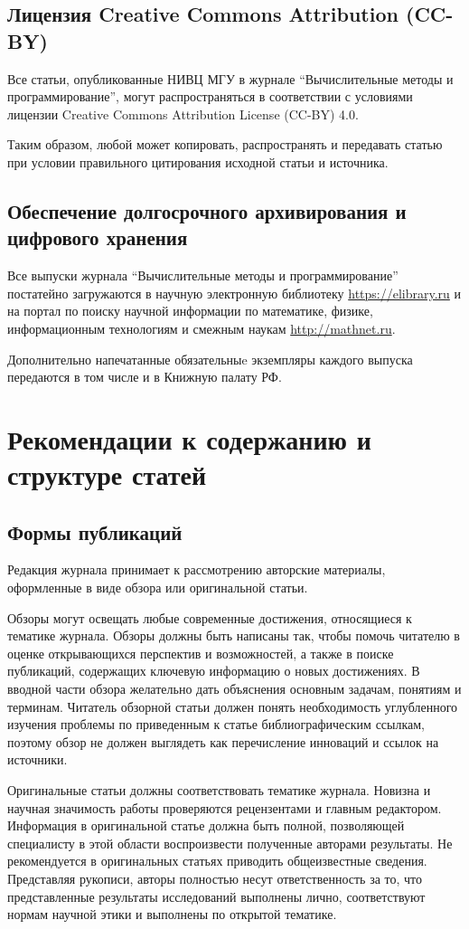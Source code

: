 \documentclass[10pt,a4paper]{book}
\begin{document}
\subsection{Лицензия Creative Commons Attribution (CC-BY)} 
Все статьи, опубликованные НИВЦ МГУ в журнале ``Вычислительные методы и программирование'', 
могут распространяться в соответствии с условиями лицензии 
Creative Commons Attribution License (CC-BY) 4.0.

Таким образом, любой может копировать, распространять и передавать статью при условии 
правильного цитирования исходной статьи и источника.

\subsection{Обеспечение долгосрочного архивирования и цифрового хранения} 
Все выпуски журнала ``Вычислительные методы и программирование'' постатейно загружаются 
в научную электронную библиотеку \url{https://elibrary.ru} и на портал по поиску научной 
информации по математике, физике, информационным технологиям и смежным наукам 
\url{http://mathnet.ru}.

Дополнительно напечатанные обязательныe экземпляры каждого выпуска передаются 
в том числе и в Книжную палату РФ.

\section{Рекомендации к содержанию и структуре статей}
\subsection{Формы публикаций}
Редакция журнала принимает к рассмотрению авторские материалы, оформленные в виде
обзора или оригинальной статьи.

Обзоры могут освещать любые современные достижения, относящиеся к тематике журнала.
Обзоры должны быть написаны так, чтобы помочь читателю в оценке открывающихся перспектив
и возможностей, а также в поиске публикаций, содержащих ключевую информацию о новых
достижениях. В вводной части обзора желательно дать объяснения основным задачам,
понятиям и терминам. Читатель обзорной статьи должен понять необходимость углубленного
изучения проблемы по приведенным к статье библиографическим ссылкам, поэтому обзор
не должен выглядеть как перечисление инноваций и ссылок на источники.

Оригинальные статьи должны соответствовать тематике журнала. Новизна и научная значимость
работы проверяются рецензентами и главным редактором. Информация в оригинальной статье
должна быть полной, позволяющей специалисту в этой области воспроизвести полученные
авторами результаты. Не рекомендуется в оригинальных статьях приводить общеизвестные
сведения. Представляя рукописи, авторы полностью несут ответственность за то, что представленные результаты исследований выполнены лично, соответствуют нормам научной этики и выполнены по открытой тематике.
\end{document}
